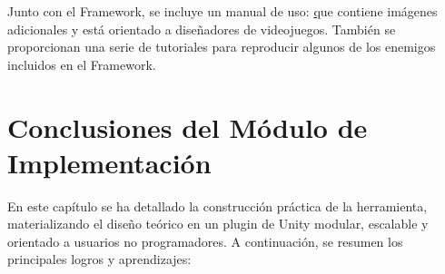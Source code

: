 Junto con el Framework, se incluye un manual de uso: \href{https://github.com/CristinaMora/EnemyBehaviourFramework-2D/tree/c1faf3195c68eb55e0c9239c02ca077aac270f7c} que contiene imágenes adicionales y está orientado a diseñadores de videojuegos. También se proporcionan una serie de tutoriales para reproducir algunos de los enemigos incluidos en el Framework.


\section{Conclusiones del Módulo de Implementación}

En este capítulo se ha detallado la construcción práctica de la herramienta, materializando el diseño teórico en un plugin de Unity modular, escalable y orientado a usuarios no programadores. A continuación, se resumen los principales logros y aprendizajes:

